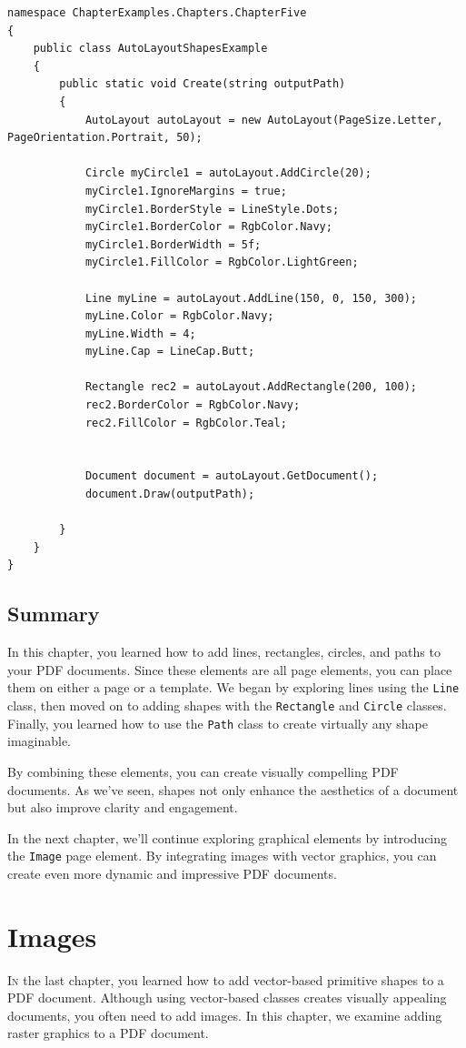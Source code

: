 \documentclass[american]{tufte-book}
\numberwithin{equation}{section}
\numberwithin{figure}{section}
\def\color#1{}%
\begin{document}
{{\begin{lstlisting}[caption={Using AutoLayout to create a PDF document.},label={lis:autolayout-shapes},basicstyle={\footnotesize\ttfamily},breaklines=true]
namespace ChapterExamples.Chapters.ChapterFive
{
    public class AutoLayoutShapesExample
    {
        public static void Create(string outputPath)
        {
            AutoLayout autoLayout = new AutoLayout(PageSize.Letter, PageOrientation.Portrait, 50);

            Circle myCircle1 = autoLayout.AddCircle(20);
            myCircle1.IgnoreMargins = true;
            myCircle1.BorderStyle = LineStyle.Dots;
            myCircle1.BorderColor = RgbColor.Navy;
            myCircle1.BorderWidth = 5f;
            myCircle1.FillColor = RgbColor.LightGreen;

            Line myLine = autoLayout.AddLine(150, 0, 150, 300);
            myLine.Color = RgbColor.Navy;
            myLine.Width = 4;
            myLine.Cap = LineCap.Butt;

            Rectangle rec2 = autoLayout.AddRectangle(200, 100);
            rec2.BorderColor = RgbColor.Navy;
            rec2.FillColor = RgbColor.Teal;


            Document document = autoLayout.GetDocument();
            document.Draw(outputPath);

        }
    }
}
\end{lstlisting}
\leavevmode\egroup

\section{Summary}

In this chapter, you learned how to add lines, rectangles, circles, and paths to your PDF documents. Since these elements are all page elements, you can place them on either a page or a template. We began by exploring lines using the \texttt{Line} class, then moved on to adding shapes with the \texttt{Rectangle} and \texttt{Circle} classes. Finally, you learned how to use the \texttt{Path} class to create virtually any shape imaginable.

By combining these elements, you can create visually compelling PDF documents. As we’ve seen, shapes not only enhance the aesthetics of a document but also improve clarity and engagement.

In the next chapter, we’ll continue exploring graphical elements by introducing the \texttt{Image} page element. By integrating images with vector graphics, you can create even more dynamic and impressive PDF documents.

\color{white}
\chapter{Images}\label{chap:Images}
\color{black}
\BgThispage
\vspace{8.00em}
\lettrine[lines=2,lhang=0.1]{I}{n} the last chapter, you learned how to add vector-based primitive
shapes to a PDF document. Although using vector-based classes creates
visually appealing documents, you often need to add images. In this
chapter, we examine adding raster graphics to a PDF document. 

}}
\end{document}
